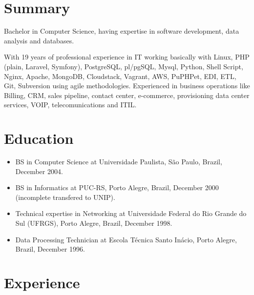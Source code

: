 \documentclass[margin]{res}
\begin{document}
  
\address{São Paulo, Brazil \\ andre.reis@gmail.com \\ Phone: +55 11 99328-9258 }
                           
                        
\begin{resume}                        
 
\section{Summary} Bachelor in Computer Science, having expertise in software development, data analysis and databases.
                        
                  With 19 years of professional experience in IT working basically with Linux, PHP (plain, Laravel, Symfony), PostgreSQL, pl/pgSQL, Mysql, Python, Shell Script, Nginx, Apache, MongoDB, Cloudstack, Vagrant, AWS, PuPHPet, EDI, ETL, Git, Subversion using agile methodologies. Experienced in business operations like Billing, CRM, sales pipeline, contact center, e-commerce, provisioning data center services, VOIP, telecomunications and ITIL.
 
\section{Education}	
  \begin{itemize}
    \item BS in Computer Science at Universidade Paulista, São Paulo, Brazil, December 2004.
    \item BS in Informatics at PUC-RS, Porto Alegre, Brazil, December 2000 (incomplete transfered to UNIP).
    \item Technical expertise in Networking at Universidade Federal do Rio Grande do Sul (UFRGS), Porto Alegre, Brazil, December 1998.
    \item Data Processing Technician at Escola Técnica Santo Inácio, Porto Alegre, Brazil, December 1996.
\end{itemize}

\section{Experience}


\end{resume}
\end{document}
